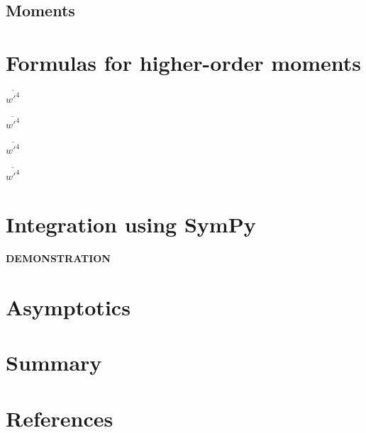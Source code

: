 \documentclass[10pt]{beamer}
\begin{document}
    \subsection{Moments}\label{subsec:moments}

    \begin{frame}{}

    \end{frame}


    \section{Formulas for higher-order moments}\label{sec:formulas-for-higher-order-moments}

    \begin{frame}{$\overline{w'^4}$}

    \end{frame}

    \begin{frame}{$\overline{w'^4}$}

    \end{frame}

    \begin{frame}{$\overline{w'^4}$}

    \end{frame}

    \begin{frame}{$\overline{w'^4}$}

    \end{frame}


    \section{Integration using SymPy}\label{sec:integration-using-sympy}

    \begin{frame}
        \begin{center}
            \textbf{DEMONSTRATION}
        \end{center}
    \end{frame}


    \section{Asymptotics}\label{sec:asymptotics}

    \begin{frame}{}

    \end{frame}


    \section{Summary}\label{sec:summary}

    \begin{frame}{}

    \end{frame}
    
    \section{References}
    \begin{frame}

    \end{frame}
\end{document}
